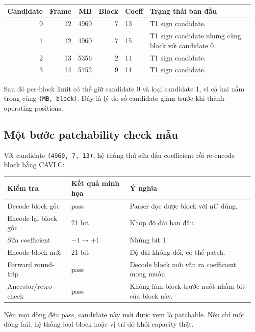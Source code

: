 \documentclass[11pt,a4paper]{article}
\begin{document}
\begin{center}
\begin{tabular}{rrrrlp{38mm}}
\toprule
Candidate & Frame & MB & Block & Coeff & Trạng thái ban đầu \\
\midrule
0 & 12 & 4960 & 7 & 13 & T1 sign candidate. \\
1 & 12 & 4960 & 7 & 15 & T1 sign candidate nhưng cùng block với candidate 0. \\
2 & 13 & 5356 & 2 & 11 & T1 sign candidate. \\
3 & 14 & 5752 & 9 & 14 & T1 sign candidate. \\
\bottomrule
\end{tabular}
\end{center}

Sau đó per-block limit có thể giữ candidate 0 và loại candidate 1, vì cả hai
nằm trong cùng \texttt{(MB, block)}. Đây là lý do số candidate giảm trước khi
thành operating positions.

\subsection{Một bước patchability check mẫu}

Với candidate \texttt{(4960, 7, 13)}, hệ thống thử sửa dấu coefficient rồi
re-encode block bằng CAVLC:

\begin{center}
\begin{tabular}{lll}
\toprule
Kiểm tra & Kết quả minh họa & Ý nghĩa \\
\midrule
Decode block gốc & pass & Parser đọc được block với nC đúng. \\
Encode lại block gốc & 21 bit & Khớp độ dài ban đầu. \\
Sửa coefficient & \(-1 \rightarrow +1\) & Nhúng bit 1. \\
Encode block mới & 21 bit & Độ dài không đổi, có thể patch. \\
Forward round-trip & pass & Decode block mới vẫn ra coefficient mong muốn. \\
Ancestor/retro check & pass & Không làm block trước nuốt nhầm bit của block này. \\
\bottomrule
\end{tabular}
\end{center}

Nếu mọi dòng đều pass, candidate này mới được xem là patchable. Nếu chỉ một
dòng fail, hệ thống loại block hoặc vị trí đó khỏi capacity thật.
\end{document}
